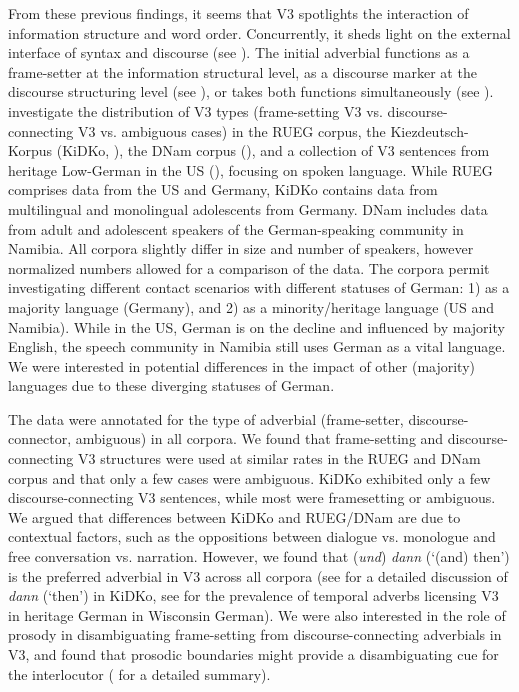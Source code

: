 \documentclass[output=paper,colorlinks,citecolor=brown]{langscibook}
\begin{document}
From these previous findings, it seems that V3 spotlights the interaction of information structure and word order. Concurrently, it sheds light on the external interface of syntax and discourse (see \cite{sorace_epistemological_2011}). The initial adverbial functions as a frame-setter at the information structural level, as a discourse marker at the discourse structuring level (see \cite{schalowski_adverbial_2017}), or takes both functions simultaneously (see \cite{bunk_aber_2020}). \citet{bunk_status_nodate} investigate the distribution of V3 types (frame-setting V3 vs. discourse-connecting V3 vs. ambiguous cases) in the RUEG corpus, the Kiezdeutsch-Korpus (KiDKo, \cite{kidko}), the DNam corpus (\cite{Dnam_corpus}), and a collection of V3 sentences from heritage Low-German in the US (\cite{rocker_variation_2022}), focusing on spoken language. While RUEG comprises data from the US and Germany, KiDKo contains data from multilingual and monolingual adolescents from Germany. DNam includes data from adult and adolescent speakers of the German-speaking community in Namibia. All corpora slightly differ in size and number of speakers, however normalized numbers allowed for a comparison of the data. The corpora permit investigating different contact scenarios with different statuses of German: 1) as a majority language (Germany), and 2) as a minority/heritage language (US and Namibia). While in the US, German is on the decline and influenced by majority English, the speech community in Namibia still uses German as a vital language. We were interested in potential differences in the impact of other (majority) languages due to these diverging statuses of German.

The data were annotated for the type of adverbial (frame-setter, discourse-connector, ambiguous) in all corpora. We found that frame-setting and discourse-connecting V3 structures were used at similar rates in the RUEG and DNam corpus and that only a few cases were ambiguous. KiDKo exhibited only a few discourse-connecting V3 sentences, while most were framesetting or ambiguous. We argued that differences between KiDKo and RUEG\slash DNam are due to contextual factors, such as the oppositions between dialogue vs. monologue and free conversation vs. narration. However, we found that (\textit{und}) \textit{dann} (‘(and) then’) is the preferred adverbial in V3 across all corpora (see \cite{wiese_hidden_2018} for a detailed discussion of \textit{dann} (‘then’) in KiDKo, see \cite{sewell_sociolinguistic_2015} for the prevalence of temporal adverbs licensing V3 in heritage German in Wisconsin German). We were also interested in the role of prosody in disambiguating frame-setting from discourse-connecting adverbials in V3, and found that prosodic boundaries might provide a disambiguating cue for the interlocutor (\cite{bunk_status_nodate, chapters/12} for a detailed summary).
\end{document}
